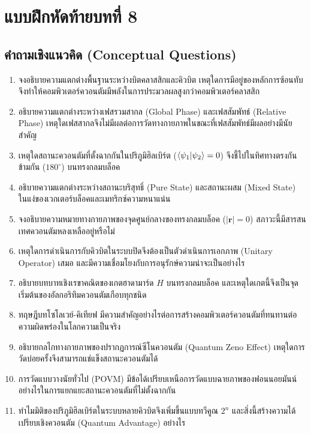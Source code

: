 \section*{แบบฝึกหัดท้ายบทที่ 8}

\subsection*{คำถามเชิงแนวคิด (Conceptual Questions)}

\begin{enumerate}[label=\textbf{\arabic*.}]
    \item จงอธิบายความแตกต่างพื้นฐานระหว่างบิตคลาสสิกและคิวบิต เหตุใดการมีอยู่ของหลักการซ้อนทับจึงทำให้คอมพิวเตอร์ควอนตัมมีพลังในการประมวลผลสูงกว่าคอมพิวเตอร์คลาสสิก
    \item อธิบายความแตกต่างระหว่างเฟสรวมสากล (Global Phase) และเฟสสัมพัทธ์ (Relative Phase) เหตุใดเฟสสากลจึงไม่มีผลต่อการวัดทางกายภาพในขณะที่เฟสสัมพัทธ์มีผลอย่างมีนัยสำคัญ
    \item เหตุใดสถานะควอนตัมที่ตั้งฉากกันในปริภูมิฮิลเบิร์ต ($\braket{\psi_1}{\psi_2} = 0$) จึงชี้ไปในทิศทางตรงกันข้ามกัน ($180^\circ$) บนทรงกลมบล็อค
    \item อธิบายความแตกต่างระหว่างสถานะบริสุทธิ์ (Pure State) และสถานะผสม (Mixed State) ในแง่ของเวกเตอร์บล็อคและเมทริกซ์ความหนาแน่น
    \item จงอธิบายความหมายทางกายภาพของจุดศูนย์กลางของทรงกลมบล็อค ($|\mathbf{r}| = 0$) สภาวะนี้มีสารสนเทศควอนตัมหลงเหลืออยู่หรือไม่
    \item เหตุใดการดำเนินการกับคิวบิตในระบบปิดจึงต้องเป็นตัวดำเนินการเอกภาพ (Unitary Operator) เสมอ และมีความเชื่อมโยงกับการอนุรักษ์ความน่าจะเป็นอย่างไร
    \item อธิบายบทบาทเชิงเรขาคณิตของเกตฮาดามาร์ด $H$ บนทรงกลมบล็อค และเหตุใดเกตนี้จึงเป็นจุดเริ่มต้นของอัลกอริทึมควอนตัมเกือบทุกชนิด
    \item ทฤษฎีบทโซโลเวย์-คิเทียฟ มีความสำคัญอย่างไรต่อการสร้างคอมพิวเตอร์ควอนตัมที่ทนทานต่อความผิดพร่องในโลกความเป็นจริง
    \item อธิบายกลไกทางกายภาพของปรากฏการณ์ซีโนควอนตัม (Quantum Zeno Effect) เหตุใดการวัดบ่อยครั้งจึงสามารถแช่แข็งสถานะควอนตัมได้
    \item การวัดแบบวางนัยทั่วไป (POVM) มีข้อได้เปรียบเหนือการวัดแบบฉายภาพของฟอนนอยมันน์อย่างไรในการแยกแยะสถานะควอนตัมที่ไม่ตั้งฉากกัน
    \item ทำไมมิติของปริภูมิฮิลเบิร์ตในระบบหลายคิวบิตจึงเพิ่มขึ้นแบบทวีคูณ $2^n$ และสิ่งนี้สร้างความได้เปรียบเชิงควอนตัม (Quantum Advantage) อย่างไร

\end{enumerate}
